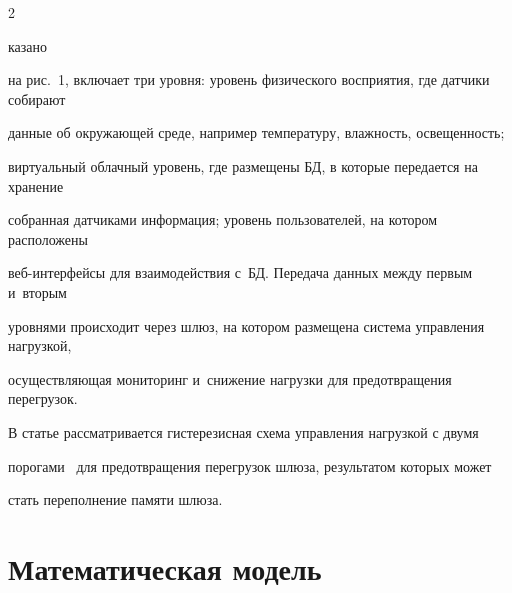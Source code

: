 \begin{multicols}{2}





\noindent


 казано 


на рис.~1, включает три уровня: уровень физического восприятия, где датчики собирают 


данные об окружающей среде, например температуру, влажность, освещенность; 


виртуальный облачный уровень, где размещены БД, в которые передается на хранение 


собранная датчиками информация; уровень пользователей, на котором расположены\linebreak  


веб-ин\-тер\-фей\-сы для взаимодействия с~БД. Передача данных между первым и~вторым 


уровнями происходит через шлюз, на котором размещена сис\-те\-ма управ\-ле\-ния нагрузкой, 


осу\-ще\-ст\-в\-ля\-ющая \mbox{мониторинг} и~снижение нагрузки для пред\-от\-вра\-ще\-ния перегрузок. 


  


  В статье рассматривается гистерезисная схема управления нагрузкой с двумя 


порогами~\cite{6-al} для пред\-от\-вра\-ще\-ния перегрузок шлюза, результатом которых может 


стать переполнение памяти \mbox{шлюза}.





\vspace*{-9pt}


  


\section{Математическая модель}





\vspace*{-3pt}





\begin{figure} %


\vspace*{1pt}



\end{figure}
\end{multicols}
